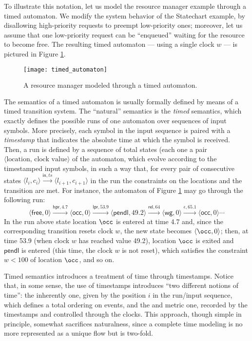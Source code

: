 To illustrate this notation, let us model the resource manager 
example through a timed automaton. We modify the system behavior 
of the Statechart example, by disallowing high-priority requests 
to preempt low-priority ones; moreover, let us assume that one 
low-priority request can be ``enqueued'' waiting for the resource 
to become free. The resulting timed automaton --- using a single 
clock $w$ --- is pictured in Figure \ref{fig:timed_automaton}.
\begin{figure}[htb!]
	 \centering
	 \texttt{[image: timed\_automaton]}
	 \caption{A resource manager modeled through a timed automaton.}
	 \label{fig:timed_automaton}
\end{figure}

The semantics of a timed automaton is usually formally defined 
by means of a timed transition system. The ``natural'' semantics 
is the \emph{timed} semantics, which exactly defines the possible 
runs of one automaton over sequences of input symbols. More precisely, 
each symbol in the input sequence is paired with a \emph{timestamp} 
that indicates the absolute time at which the symbol is received. 
Then, a run is defined by a sequence of total states (each one 
a pair $\langle \text{location, clock value} \rangle$ of 
the automaton, which evolve according to the timestamped input 
symbols, in such a way that, for every pair of consecutive states
$\langle l_i, c_i \rangle \xrightarrow{\mathsf{in}, ts} \langle l_{i+1}, c_{i+1} \rangle$
in the run the constraints on the locations and the transition 
are met. For instance, the automaton of Figure \ref{fig:timed_automaton} may go through 
the following run:
\begin{equation*}
 \langle \mathsf{free}, 0 \rangle \xrightarrow{\mathsf{hpr}, 4.7} \langle \mathsf{occ}, 0 \rangle \xrightarrow{\mathsf{lpr}, 53.9} \langle \mathsf{pendl}, 49.2 \rangle \xrightarrow{\mathsf{rel}, 64} \langle \mathsf{wg}, 0 \rangle \xrightarrow{\epsilon, 65.1} \langle \mathsf{occ}, 0 \rangle \cdots
\end{equation*}
In the run above state location $\occ$ is entered at time 4.7 
and, since the corresponding transition resets clock $w$, the 
new state becomes $\langle \occ, 0 \rangle$; then, at time 
53.9 (when clock $w$ has reached value 49.2), location $\occ$
is exited and $\mathsf{pendl}$ is entered (this time, the clock $w$ 
is not reset), which satisfies the constraint $w < 100$
of location $\occ$, and so on.

Timed semantics introduces a  treatment of time through 
timestamps. Notice that, in some sense, the use of timestamps 
introduces ``two different notions of time'': the inherently  
one, given by the position $i$ in the run/input sequence, which 
defines a total ordering on events, and the  and metric 
one, recorded by the timestamps and controlled through the clocks. 
This approach, though simple in principle, somewhat sacrifices 
naturalness, since a complete time modeling is no more represented 
as a unique flow but is two-fold.

